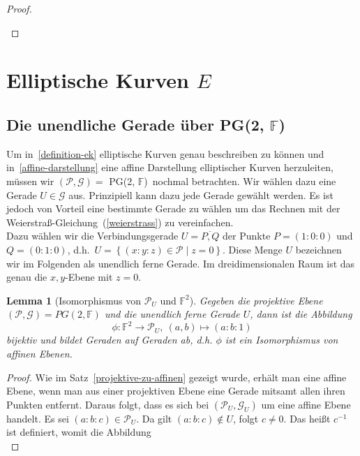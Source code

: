 \documentclass[hidelinks]{article}
\theoremstyle{plain}
\newtheorem{lem}[thm]{Lemma}
\theoremstyle{definition}
\theoremstyle{rem}
\newcommand{\pgtwo}{PG(2, $\mathbb{F}$)\ }
\newcommand{\pu}{\mathcal{P}_U}
\begin{document}
\begin{sloppypar}
\begin{proof}
\begin{enumerate}
\end{enumerate}
\end{proof}
\section{Elliptische Kurven $E$}
\subsection{Die unendliche Gerade über \pgtwo}
Um in~\ref{definition-ek} elliptische Kurven genau beschreiben zu können und in~\ref{affine-darstellung} eine affine Darstellung elliptischer Kurven herzuleiten, müssen wir $(\mathcal{P,G}) =$ \pgtwo nochmal betrachten.
Wir wählen dazu eine Gerade $U \in \mathcal{G}$ aus. 
Prinzipiell kann dazu jede Gerade gewählt werden. 
Es ist jedoch von Vorteil eine bestimmte Gerade zu wählen um das Rechnen mit der Weierstraß-Gleichung~(\ref{weierstrass}) zu vereinfachen. \\
\newline
Dazu wählen wir die Verbindungsgerade $U = \overline{P,Q}$ der Punkte $P = (1:0:0)$ und $Q = (0:1:0)$, d.h.\ $U = \left\{ (x:y:z) \in \mathcal{P} \mid z = 0 \right\}$. 
Diese Menge $U$ bezeichnen wir im Folgenden als unendlich ferne Gerade.
Im dreidimensionalen Raum ist das genau die $x,y$-Ebene mit $z=0$. \\ 
\begin{lem}[Isomorphismus von $\pu$ und $\mathbb{F}^2$]
    Gegeben die projektive Ebene $(\mathcal{P}, \mathcal{G}) = PG(2,\mathbb{F})$ und die unendlich ferne Gerade $U$, dann ist die Abbildung
    \begin{equation*}
        \phi: \mathbb{F}^2 \rightarrow \mathcal{P}_U,\ (a,b) \mapsto (a:b:1)
    \end{equation*}
    bijektiv und bildet Geraden auf Geraden ab, d.h. $\phi$ ist ein Isomorphismus von affinen Ebenen. 
\end{lem}
\begin{proof} \label{isomorphismus-lemma}
    Wie im Satz~\ref{projektive-zu-affinen} gezeigt wurde, erhält man eine affine Ebene, wenn man aus einer projektiven Ebene eine Gerade mitsamt allen ihren Punkten entfernt. Daraus folgt, dass es sich bei $(\mathcal{P}_U, \mathcal{G}_U)$ um eine affine Ebene handelt. Es sei $(a:b:c) \in \mathcal{P}_U$. Da gilt $(a:b:c) \notin U$, folgt $c \neq 0$. Das heißt $c^{-1}$ ist definiert, womit die Abbildung
    \begin{equation*}

\end{equation*}
\end{proof}
\end{sloppypar}
\end{document}
